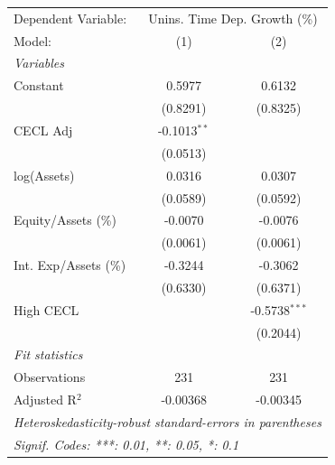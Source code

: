 
\begingroup
\centering
\begin{tabular}{lcc}
   \tabularnewline \midrule \midrule
   Dependent Variable: & \multicolumn{2}{c}{Unins. Time Dep. Growth (\%)}\\
   Model:                & (1)            & (2)\\  
   \midrule
   \emph{Variables}\\
   Constant              & 0.5977         & 0.6132\\   
                         & (0.8291)       & (0.8325)\\   
   CECL Adj              & -0.1013$^{**}$ &   \\   
                         & (0.0513)       &   \\   
   log(Assets)           & 0.0316         & 0.0307\\   
                         & (0.0589)       & (0.0592)\\   
   Equity/Assets (\%)    & -0.0070        & -0.0076\\   
                         & (0.0061)       & (0.0061)\\   
   Int. Exp/Assets (\%)  & -0.3244        & -0.3062\\   
                         & (0.6330)       & (0.6371)\\   
   High CECL             &                & -0.5738$^{***}$\\   
                         &                & (0.2044)\\   
   \midrule
   \emph{Fit statistics}\\
   Observations          & 231            & 231\\  
   Adjusted R$^2$        & -0.00368       & -0.00345\\  
   \midrule \midrule
   \multicolumn{3}{l}{\emph{Heteroskedasticity-robust standard-errors in parentheses}}\\
   \multicolumn{3}{l}{\emph{Signif. Codes: ***: 0.01, **: 0.05, *: 0.1}}\\
\end{tabular}
\par\endgroup



